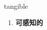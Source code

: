 
\begin{frame}
{\huge tangible}
\begin{center}
\begin{enumerate}\Large
  \item \textbf{可感知的}
\end{enumerate}
\end{center}
\end{frame}
